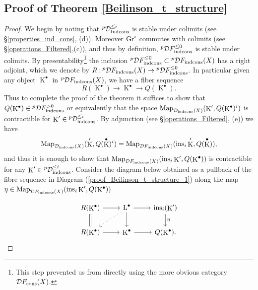 \documentclass[12pt, reqno]{amsart}
\theoremstyle{plain}
\theoremstyle{definition}
\theoremstyle{definition}
\newcommand{\cD}{{\mathcal D}}
\DeclareMathOperator{\KK}{K}
\begin{document}
\subsection{Proof of Theorem \ref{Beilinson_t_structure}}\label{proof_Beilinson_t_Structure}
\begin{proof}
    We begin by noting that $^{p}\cD_{\textup{Indcons}}^{\leq i}$ is stable under colimits (see \S \ref{properties_ind_cons}, (d)). Moreover $\textup{Gr}^{i}$ commutes with colimits (see \S \ref{operations_Filtered},(c)), and thus by definition, $^p\cD F_{\textup{indcons}}^{\leq 0}$ is stable under colimits. By presentability\footnote{This step prevented us from directly using the more obvious category $\cD F_{\textup{cons}}(X)$.} the inclusion $^p\cD F_{\textup{indcons}}^{\leq 0} \subset{}^p\cD F_{\textup{indcons}}(X)$ has a right adjoint, which we denote by $R \colon{}^p\cD F_{\textup{indcons}}(X) \to{}^p\cD F_{\textup{indcons}}^{\leq 0}$. In particular given any object $\KK^{\bullet}$ in $^p\cD F_{\textup{indcons}}(X)$, we have a fiber sequence
    \begin{equation}\label{proof_Beilinson_t_structure_1}
    R(\KK^{\bullet}) \to \KK^{\bullet} \to Q(\KK^{\bullet}).
    \end{equation}
    \noindent Thus to complete the proof of the theorem it suffices to show that $Q(\KK^{\bullet}) \in{}^p\cD F_{\textup{indcons}}^{>0}$ or equivalently that the space $\textup{Map}_{\cD_{\textup{indcons}}(X)}(\KK',Q(\KK^{\bullet})^{i})$ is contractible for $\KK' \in{}^p\cD_{\textup{indcons}}^{\leq i}$. By adjunction (see \S \ref{operations_Filtered}, (e)) we have 
    \[
    \textup{Map}_{\cD_{\textup{indcons}}(X)}(\KK',Q(\KK^{\bullet})^{i})=\textup{Map}_{\cD F_{\textup{indcons}}(X)}(\textup{ins}_{i}\KK',Q(\KK^{\bullet})),
    \]
\noindent and thus it is enough to show that $\textup{Map}_{\cD F_{\textup{indcons}}(X)}(\textup{ins}_{i}\KK',Q(\KK^{\bullet}))$ is contractible for any $\KK' \in{}^p\cD_{\textup{indcons}}^{\leq i}$. Consider the diagram below obtained as a pullback of the fibre sequence in Diagram (\ref{proof_Beilinson_t_structure_1}) along the map $\eta \in \textup{Map}_{\cD F_{\textup{indcons}}(X)}(\textup{ins}_{i}\KK',Q(\KK^{\bullet}))$

\begin{equation}\label{proof_Beilinson_t_structure_2}
    \begin{tikzcd}
        R(\KK^{\bullet}) \arrow[r] \arrow[d,equal] & \textup{L}^{\bullet} \arrow[r] \arrow[dl,dotted] \arrow[d] &\textup{ins}_i(\KK') \arrow[d,"\eta"] \\
        R(\KK^{\bullet}) \arrow[r] & \KK^{\bullet} \arrow[r] & Q(\KK^{\bullet}).
    \end{tikzcd}
\end{equation}


\end{proof}
\end{document}
